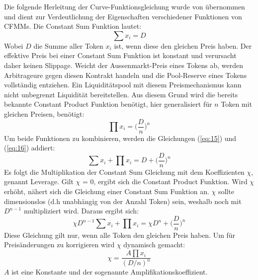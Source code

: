 \documentclass[12pt,a4paper,titlepage,oneside,english]{article}
\begin{document}
Die folgende Herleitung der Curve-Funktionsgleichung wurde von \citet[S.4f.]{Egorov2019} übernommen und dient zur Verdeutlichung der Eigenschaften verschiedener Funktionen von CFMMs.
Die Constant Sum Funktion lautet: 
\begin{equation}
\sum x_{i}= D \label{eq:15} 
\end{equation}
Wobei $D$ die Summe aller Token $x_{i}$ ist, wenn diese den gleichen Preis haben. %
Der effektive Preis bei einer Constant Sum Funktion ist konstant und verursacht daher keinen Slippage. Weicht der Aussenmarkt-Preis eines Tokens %
ab, werden Arbitrageure gegen diesen Kontrakt handeln und die Pool-Reserve eines Tokens vollständig entziehen. Ein Liquiditätspool mit diesem Preismechanismus kann nicht unbegrenzt Liquidität bereitstellen.
Aus diesem Grund wird die bereits bekannte Constant Product Funktion benötigt, hier generalisiert für $n$ Token mit gleichen Preisen, benötigt:
\begin{equation}
\prod x_{i} = \biggl(\dfrac{D}{n}\biggr)^n \label{eq:16}
\end{equation}
Um beide Funktionen zu kombinieren, werden die Gleichungen (\ref{eq:15}) und (\ref{eq:16}) addiert:
\begin{equation}
\sum x_{i} + \prod x_{i} = D + \biggl(\dfrac{D}{n}\biggr)^n \label{eq:17}
\end{equation}
Es folgt die Multiplikation der Constant Sum Gleichung mit dem Koeffizienten $\chi$, genannt Leverage. Gilt $\chi$ = 0, ergibt sich die Constant Product Funktion. Wird $\chi$ erhöht, nähert sich die Gleichung einer Constant Sum Funktion an. $\chi$ sollte dimensionslos (d.h unabhängig von der Anzahl Token) sein, weshalb noch mit $D^{n-1}$ multipliziert wird. Daraus ergibt sich:
\begin{equation}
\chi D^{n-1}\sum x_{i} + \prod x_{i}=\chi D^n + \biggl(\dfrac{D}{n}\biggr)^n  \label{eq:18}
\end{equation}
Diese Gleichung gilt nur, wenn alle Token den gleichen Preis haben. %
Um für Preisänderungen zu korrigieren wird $\chi$ dynamisch gemacht:
\begin{equation}
\chi = \dfrac{A \prod x_{i}}{(D/n)^n} \label{eq:19}
\end{equation}
$A$ ist eine Konstante und der sogenannte Amplifikationskoeffizient. %
\end{document}
